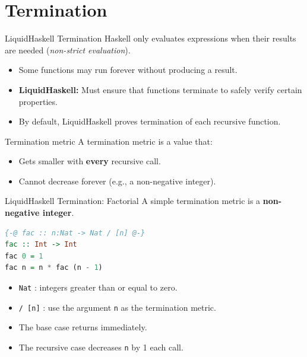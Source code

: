 \documentclass[aspectratio=169]{beamer}
\let\originaltexttt\texttt
\renewcommand{\texttt}[1]{%
  \begingroup
  \setlength{\fboxsep}{2pt}%
  \colorbox{themeTrack!65}{%
    \textcolor{themeText}{\originaltexttt{#1}}%
  }%
  \endgroup
}
\begin{document}
\section{Termination}

\begin{frame}{LiquidHaskell Termination}
	Haskell only evaluates expressions when their results are needed (\emph{non-strict evaluation}).

	\begin{itemize}
		\item Some functions may run forever without producing a result.
		\item \textbf{LiquidHaskell:} Must ensure that functions terminate to safely verify certain properties.
		\item By default, LiquidHaskell proves termination of each recursive function.
	\end{itemize}

	\begin{exampleblock}{Termination metric}
		\vspace{0.1em}
		A termination metric is a value that:
		\begin{itemize}
			\item Gets smaller with \textbf{every} recursive call.
			\item Cannot decrease forever (e.g., a non-negative integer).
		\end{itemize}
	\end{exampleblock}
\end{frame}

\begin{frame}[fragile]{LiquidHaskell Termination: Factorial}
	A simple termination metric is a \textbf{non-negative integer}.

	\begin{lstlisting}[language=Haskell]
{-@ fac :: n:Nat -> Nat / [n] @-}
fac :: Int -> Int
fac 0 = 1
fac n = n * fac (n - 1)
\end{lstlisting}

	\begin{itemize}
		\item \texttt{Nat}: integers greater than or equal to zero.
		\item \texttt{/ [n]}: use the argument \texttt{n} as the termination metric.
		\item The base case returns immediately.
		\item The recursive case decreases \texttt{n} by 1 each call.
	\end{itemize}
\end{frame}
\end{document}
